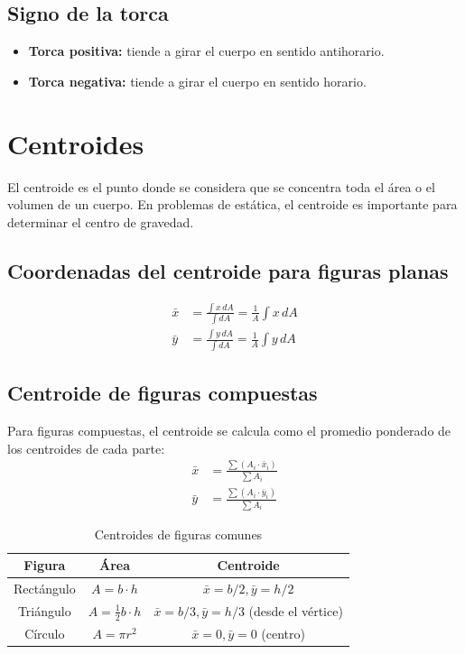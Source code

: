 \subsection{Signo de la torca}
\begin{itemize}
    \item \textbf{Torca positiva:} tiende a girar el cuerpo en sentido antihorario.
    \item \textbf{Torca negativa:} tiende a girar el cuerpo en sentido horario.
\end{itemize}

\section{Centroides}

El centroide es el punto donde se considera que se concentra toda el área o el volumen de un cuerpo. En problemas de estática, el centroide es importante para determinar el centro de gravedad.

\subsection{Coordenadas del centroide para figuras planas}
\begin{align}
    \bar{x} &= \frac{\int x \, dA}{\int dA} = \frac{1}{A} \int x \, dA \\
    \bar{y} &= \frac{\int y \, dA}{\int dA} = \frac{1}{A} \int y \, dA
\end{align}

\subsection{Centroide de figuras compuestas}
Para figuras compuestas, el centroide se calcula como el promedio ponderado de los centroides de cada parte:
\begin{align}
    \bar{x} &= \frac{\sum (A_i \cdot \bar{x}_i)}{\sum A_i} \\
    \bar{y} &= \frac{\sum (A_i \cdot \bar{y}_i)}{\sum A_i}
\end{align}

\begin{table}[h!]
    \centering
    \begin{tabular}{|c|c|c|}
        \hline
        \textbf{Figura} & \textbf{Área} & \textbf{Centroide} \\
        \hline
        Rectángulo & $A = b \cdot h$ & $\bar{x} = b/2, \bar{y} = h/2$ \\
        Triángulo & $A = \frac{1}{2} b \cdot h$ & $\bar{x} = b/3, \bar{y} = h/3$ (desde el vértice) \\
        Círculo & $A = \pi r^2$ & $\bar{x} = 0, \bar{y} = 0$ (centro) \\
        \hline
    \end{tabular}
    \caption{Centroides de figuras comunes}
\end{table}

